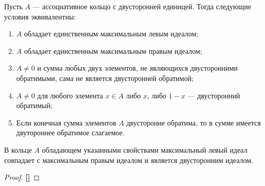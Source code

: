 
\begin{theorem}
	Пусть $ A $ --- ассоциативное кольцо с двусторонней единицей. Тогда следующие условия эквивалентны:
	\begin{enumerate}
		\item $ A $ обладает единственным максимальным левым идеалом;
		\item $ A $ обладает единственным максимальным правым идеалом;
		\item $ A \neq 0 $ и сумма любых двух элементов, не являющихся двусторонними обратимыми, сама не является двусторонней обратимой;
		\item $ A \neq 0 $ для любого элемента $ x \in A $ либо $ x $, либо $ 1 - x $ --- двусторонний обратимый;
		\item Если конечная сумма элементов $ A $ двусторонне обратима, то в сумме имеется двутороннее обратимое слагаемое.
	\end{enumerate}

	В кольце $ A $ обладающем указанными свойствами максимальный левый идеал совпадает с максимальным правым идеалом
	и является двусторонним идеалом.
\end{theorem}

\begin{proof}
	\hfill
	
	\textbf{[]}
	
	
\end{proof}